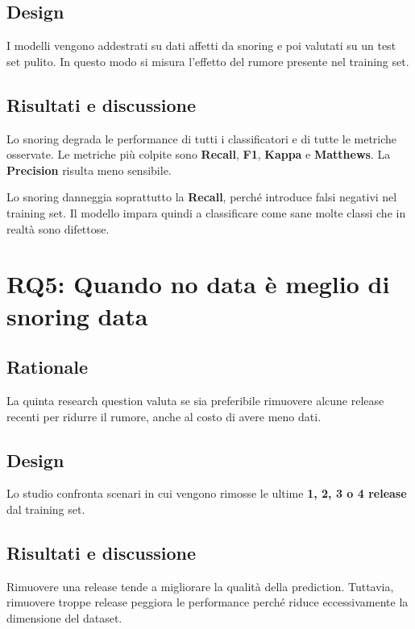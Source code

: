 \subsection{Design}

I modelli vengono addestrati su dati affetti da snoring e poi valutati su un test set pulito. In questo modo si misura l'effetto del rumore presente nel training set.

\subsection{Risultati e discussione}

Lo snoring degrada le performance di tutti i classificatori e di tutte le metriche osservate. Le metriche più colpite sono \textbf{Recall}, \textbf{F1}, \textbf{Kappa} e \textbf{Matthews}. La \textbf{Precision} risulta meno sensibile.

\begin{notaesame}
Lo snoring danneggia soprattutto la \textbf{Recall}, perché introduce falsi negativi nel training set. Il modello impara quindi a classificare come sane molte classi che in realtà sono difettose.
\end{notaesame}

\section{RQ5: Quando no data è meglio di snoring data}

\subsection{Rationale}

La quinta research question valuta se sia preferibile rimuovere alcune release recenti per ridurre il rumore, anche al costo di avere meno dati.

\subsection{Design}

Lo studio confronta scenari in cui vengono rimosse le ultime \textbf{1, 2, 3 o 4 release} dal training set.

\subsection{Risultati e discussione}

Rimuovere una release tende a migliorare la qualità della prediction. Tuttavia, rimuovere troppe release peggiora le performance perché riduce eccessivamente la dimensione del dataset.

